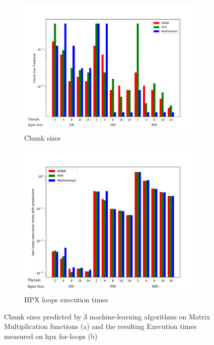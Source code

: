 \begin{figure}[h]
	\centering
	\begin{subfigure}[b]{0.515\textwidth}
		\centering
		\includegraphics[width=\textwidth]{images/matrix_mult_prediction_bars.png}
		\caption[Network2]%
		{{Chunk sizes}}    
	\end{subfigure}
	\hfill
	\begin{subfigure}[b]{0.475\textwidth}  
		\centering 
		\includegraphics[width=\textwidth]{images/matrix_mult_times_bars.png}
		\caption[]%
		{{HPX loops execution times}}    
	\end{subfigure}
	\caption{Chunk sizes predicted by 3 machine-learning algorithms on Matrix Multiplication functions (a) and the resulting Execution times measured on hpx for-loops (b)} 
	
\end{figure}



